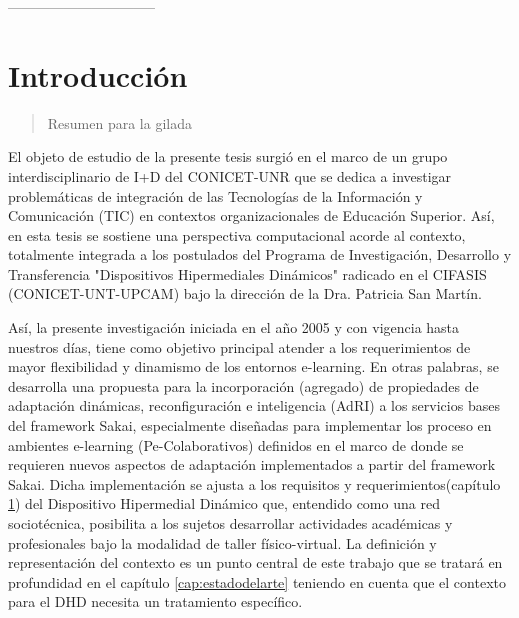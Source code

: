 --------------------------------
\parskip=0.6cm

\chapter{Introducción}\label{cap:1} \label{cap:introduccion}


\begin{abstract}
Resumen para la gilada
\end{abstract}

El objeto de estudio de la presente tesis surgió en el marco de un grupo interdisciplinario de I+D del CONICET-UNR que se dedica a investigar problemáticas de integración de las Tecnologías de la Información y Comunicación (TIC) en contextos organizacionales de Educación Superior. Así, en esta tesis se sostiene una perspectiva computacional acorde al contexto, totalmente integrada a los postulados del Programa de Investigación, Desarrollo y Transferencia "Dispositivos Hipermediales Dinámicos" radicado en el CIFASIS (CONICET-UNT-UPCAM) bajo la dirección de la Dra. Patricia San Martín.

Así, la presente investigación iniciada en el año 2005 y con vigencia hasta nuestros días, tiene como objetivo principal atender a los requerimientos de mayor flexibilidad y dinamismo de los entornos e-learning. En otras palabras, se desarrolla una propuesta para la incorporación (agregado) de propiedades de adaptación dinámicas, reconfiguración e inteligencia (AdRI) \label{AdRI} a los servicios bases del framework Sakai,
especialmente diseñadas para implementar los proceso en ambientes e-learning (Pe-Colaborativos) definidos en el marco de \cite{cacic2007.9} donde se requieren nuevos aspectos de adaptación \cite{librounq} implementados a partir del framework Sakai. Dicha
implementación se ajusta a los requisitos y requerimientos(capítulo \ref{cap:1}) del Dispositivo Hipermedial Dinámico que, entendido como una red sociotécnica, posibilita a los sujetos desarrollar actividades académicas y profesionales bajo la modalidad de taller físico-virtual. 
La definición y representación del
contexto es un punto central de este trabajo que se tratará en profundidad en el
capítulo \ref{cap:estadodelarte} teniendo en cuenta que el contexto para el DHD necesita un
tratamiento específico.

